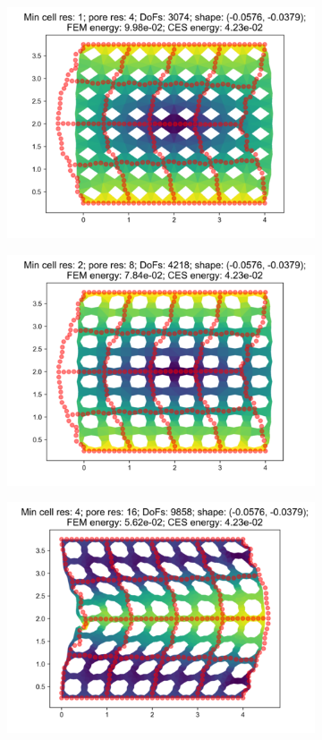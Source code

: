\begin{figure}[H]
\begin{subfigure}{.45\textwidth}
  \centering
  \includegraphics[width=.8\linewidth]{lces/vis_compression/bm_1_mesh_0.png}
\end{subfigure}
\begin{subfigure}{.45\textwidth}
  \centering
  \includegraphics[width=.8\linewidth]{lces/vis_compression/bm_1_mesh_1.png}
\end{subfigure}
\newline
\begin{subfigure}{.45\textwidth}
  \centering
  \includegraphics[width=.8\linewidth]{lces/vis_compression/bm_1_mesh_2.png}

\end{subfigure}
\end{figure}
